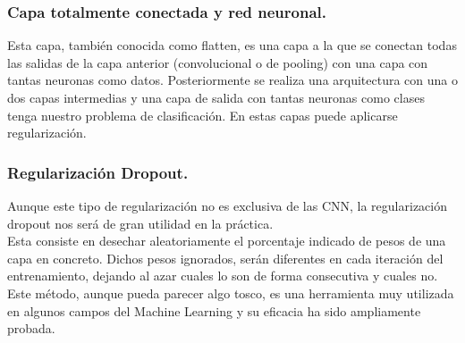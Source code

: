 \documentclass[a4paper,11pt]{article}
\begin{document}
\subsubsection{Capa totalmente conectada y red neuronal.}
Esta capa, también conocida como flatten, es una capa a la que se conectan todas las salidas de la capa anterior (convolucional o de pooling) con una capa con tantas neuronas como datos. Posteriormente se realiza una arquitectura con una o dos capas intermedias y una capa de salida con tantas neuronas como clases tenga nuestro problema de clasificación. En estas capas puede aplicarse regularización.
\subsubsection{Regularización Dropout.}
Aunque este tipo de regularización no es exclusiva de las CNN, la regularización dropout nos será de gran utilidad en la práctica. \\

\noindent
Esta consiste en desechar aleatoriamente el porcentaje indicado de pesos de una capa en concreto. Dichos pesos ignorados, serán diferentes en cada iteración del entrenamiento, dejando al azar cuales lo son de forma consecutiva y cuales no.\\ 

\noindent
Este método, aunque pueda parecer algo tosco, es una herramienta muy utilizada en algunos campos del Machine Learning y su eficacia ha sido ampliamente probada.
\end{document}
